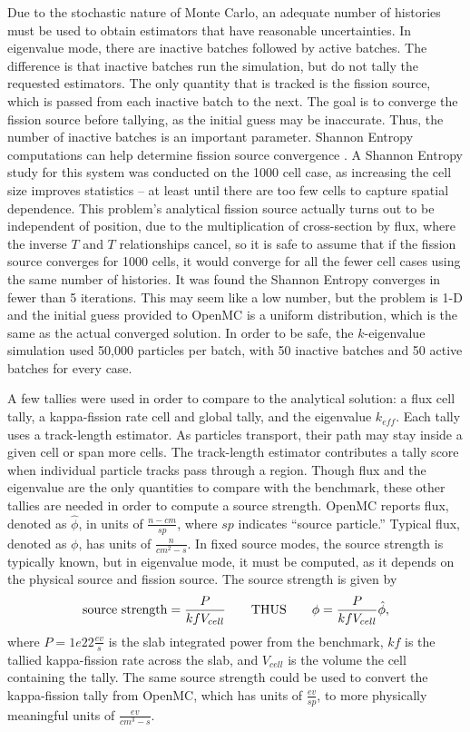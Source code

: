 \documentclass[letterpaper]{mc2023}
\begin{document}
Due to the stochastic nature of Monte Carlo, an adequate number of histories must be used to obtain estimators that have reasonable
uncertainties. In eigenvalue mode, there are inactive batches followed by active batches. The difference is that inactive batches run
the simulation, but do not tally the requested estimators. The only quantity that is tracked is the fission source, which is passed from
each inactive batch to the next. The goal is to converge the fission source before tallying, as the initial guess may be inaccurate.
Thus, the number of inactive batches is an important parameter. Shannon Entropy computations can help determine fission source convergence
\cite{brown-entropy-2006}. A Shannon Entropy study for this system was conducted on the 1000 cell case, as increasing the cell size
improves statistics -- at least until there are too few cells to capture spatial dependence. This problem's analytical fission source
actually turns out to be independent of position, due to the multiplication of cross-section by flux, where the inverse $T$ and $T$
relationships cancel, so it is safe to assume that if the fission source converges for 1000 cells, it would converge for all the fewer
cell cases using the same number of histories. It was found the Shannon Entropy converges in fewer than 5 iterations. This may seem
like a low number, but the problem is 1-D and the initial guess provided to OpenMC is a uniform distribution, which is the same as the
actual converged solution. In order to be safe, the $k$-eigenvalue simulation used 50,000 particles per batch, with 50 inactive batches
and 50 active batches for every case.

A few tallies were used in order to compare to the analytical solution: a flux cell tally, a kappa-fission rate cell and global tally,
and the eigenvalue $k_{eff}$. Each tally uses a track-length estimator. As particles transport, their path may stay inside a given cell
or span more cells. The track-length estimator contributes a tally score when individual particle tracks pass through a region. Though
flux and the eigenvalue are the only quantities to compare with the benchmark, these other tallies are needed in order to compute a
source strength. OpenMC reports flux, denoted as $\hat{\phi}$, in units of $\frac{n-cm}{sp}$, where $sp$ indicates ``source particle.''
Typical flux, denoted as $\phi$, has units of $\frac{n}{cm^2-s}$. In fixed source modes, the source strength is typically known, but in
eigenvalue mode, it must be computed, as it depends on the physical source and fission source. The source strength is given by
\begin{equation} \label{eq:source_strength}
   \text{source strength} = \frac{P}{kf V_{cell}} \qquad \text{THUS} \qquad \phi = \frac{P}{kf V_{cell} }\hat{\phi},
\end{equation}
where $P=1e22 \frac{ev}{s}$ is the slab integrated power from the benchmark, $kf$ is the tallied kappa-fission rate across the slab,
and $V_{cell}$ is the volume the cell containing the tally. The same source strength could be used to convert the kappa-fission tally from
OpenMC, which has units of $\frac{ev}{sp}$, to more physically meaningful units of $\frac{ev}{cm^3-s}$.
\end{document}
